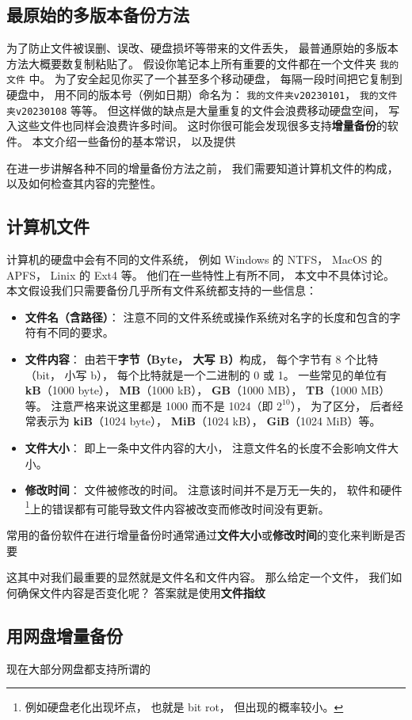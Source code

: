 
\subsection{最原始的多版本备份方法}
为了防止文件被误删、误改、硬盘损坏等带来的文件丢失， 最普通原始的多版本方法大概要数复制粘贴了。 假设你笔记本上所有重要的文件都在一个文件夹 \verb|我的文件| 中。 为了安全起见你买了一个甚至多个移动硬盘， 每隔一段时间把它复制到硬盘中， 用不同的版本号（例如日期）命名为： \verb|我的文件夹v20230101|， \verb|我的文件夹v20230108| 等等。 但这样做的缺点是大量重复的文件会浪费移动硬盘空间， 写入这些文件也同样会浪费许多时间。 这时你很可能会发现很多支持\textbf{增量备份}的软件。 本文介绍一些备份的基本常识， 以及提供

在进一步讲解各种不同的增量备份方法之前， 我们需要知道计算机文件的构成， 以及如何检查其内容的完整性。

\subsection{计算机文件}
计算机的硬盘中会有不同的文件系统， 例如 Windows 的 NTFS， MacOS 的 APFS， Linix 的 Ext4 等。 他们在一些特性上有所不同， 本文中不具体讨论。 本文假设我们只需要备份几乎所有文件系统都支持的一些信息：
\begin{itemize}
\item \textbf{文件名（含路径）}： 注意不同的文件系统或操作系统对名字的长度和包含的字符有不同的要求。
\item \textbf{文件内容}： 由若干\textbf{字节（Byte， 大写 B）}构成， 每个字节有 8 个比特（bit， 小写 b）， 每个比特就是一个二进制的 0 或 1。 一些常见的单位有 \textbf{kB}（1000 byte）， \textbf{MB}（1000 kB）， \textbf{GB}（1000 MB）， \textbf{TB}（1000 MB）等。 注意严格来说这里都是 1000 而不是 1024（即 $2^{10}$）， 为了区分， 后者经常表示为 \textbf{kiB}（1024 byte）， \textbf{MiB}（1024 kB）， \textbf{GiB}（1024 MiB）等。
\item \textbf{文件大小}： 即上一条中文件内容的大小， 注意文件名的长度不会影响文件大小。
\item \textbf{修改时间}： 文件被修改的时间。 注意该时间并不是万无一失的， 软件和硬件\footnote{例如硬盘老化出现坏点， 也就是 bit rot， 但出现的概率较小。}上的错误都有可能导致文件内容被改变而修改时间没有更新。
\end{itemize}
常用的备份软件在进行增量备份时通常通过\textbf{文件大小}或\textbf{修改时间}的变化来判断是否要

这其中对我们最重要的显然就是文件名和文件内容。 那么给定一个文件， 我们如何确保文件内容是否变化呢？ 答案就是使用\textbf{文件指纹}


\subsection{用网盘增量备份}
现在大部分网盘都支持所谓的
